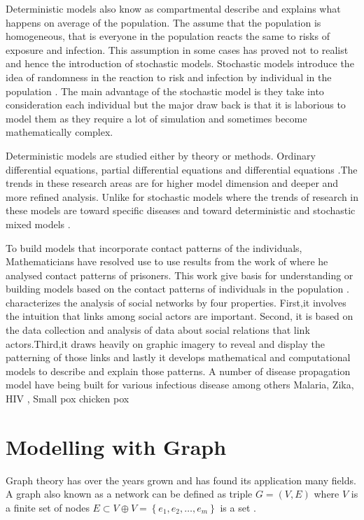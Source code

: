  
 Deterministic models also know as compartmental describe and explains what happens on average of the population. The assume that the population is homogeneous, that is everyone in the population reacts the same to risks of exposure and infection. This assumption in some cases has proved not to realist and hence the introduction of stochastic models.  Stochastic models introduce the idea of randomness in the reaction to risk and infection by individual in the population \citep{ming2016stochastic}. The main advantage of the stochastic model is they take into consideration each individual but the major draw back is that it is laborious to model them as they require a lot of simulation and sometimes become mathematically complex.
 
 Deterministic models are studied either by theory or methods. Ordinary differential equations, partial differential equations and differential equations \citep{keeling2008modeling}.The trends in these research areas are for higher model dimension and deeper and more refined analysis. Unlike for stochastic models where the trends of research in these models are
toward specific diseases and toward deterministic and stochastic mixed models \citep{fu2013propagation}.


 
 To build models that incorporate contact patterns of the individuals, Mathematicians have resolved use to use results from the work of \cite{moreno1945application} where he analysed contact patterns of prisoners. This work give basis for understanding or building models based on the contact patterns of individuals in the population \citep{sat}. \cite{freeman2004development} characterizes the analysis of social networks by four properties. First,it involves the intuition
 that links among social actors 
are important. Second, it is based on the data collection and analysis of data about social relations that link actors.Third,it draws heavily on graphic imagery to reveal and display the patterning of those links and lastly it develops mathematical and computational models to describe and explain those patterns. 
 A number of disease propagation model have being built for various infectious disease among others Malaria, Zika, HIV , Small pox chicken pox \citep{ding2016mathematical}

\section{Modelling with Graph}
Graph theory has over the years grown and has found its application many fields. A graph also known as a network   can be  defined as triple $G = (V,E)$ where $V$ is a finite set of nodes $E \subset V \oplus V = \left\lbrace e_1,e_2,\dots ,e_m \right\rbrace$ is a set  \citep{estrada2012structure}. 

